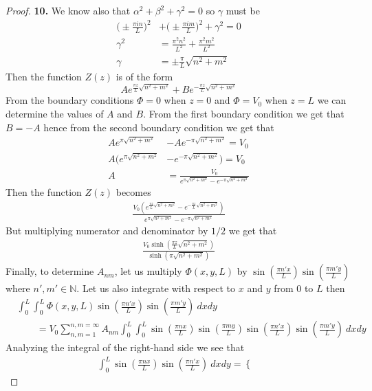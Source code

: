 \documentclass[11pt]{article}
\newcommand{\N}{\mathbb{N}}
\theoremstyle{definition}
\begin{document}
\begin{proof}{\textbf{10.}}
We know also that $\alpha^2 + \beta^2 + \gamma^2 = 0$ so $\gamma$ must be 
\begin{align*}
    \bigg(\pm\frac{\pi i n}{L}\bigg)^2 &+ \bigg(\pm\frac{\pi i m}{L}\bigg)^2
    + \gamma^2 = 0\\
    \gamma^2 &= \frac{\pi^2 n^2}{L^2} + \frac{\pi^2m^2}{L^2}\\
    \gamma &= \pm\frac{\pi}{L}\sqrt{n^2 + m^2}
\end{align*}
Then the function $Z(z)$ is of the form
$$Ae^{\frac{\pi z}{L}\sqrt{n^2 + m^2}} + Be^{-\frac{\pi z}{L}\sqrt{n^2 + m^2}}$$
From the boundary conditions $\Phi = 0$ when $z = 0$ and $\Phi = V_0$ when
$z = L$ we can determine the values of $A$ and $B$. From the first boundary
condition we get that $B = -A$ hence from the second boundary condition
we get that
\begin{align*}
    Ae^{\pi\sqrt{n^2 + m^2}} &- Ae^{-\pi\sqrt{n^2 + m^2}} = V_0\\
    A(e^{\pi\sqrt{n^2 + m^2}} &- e^{-\pi\sqrt{n^2 + m^2}}) = V_0\\
    A &= \frac{V_0}{e^{\pi\sqrt{n^2 + m^2}} - e^{-\pi\sqrt{n^2 + m^2}}}
\end{align*}
Then the function $Z(z)$ becomes 
\begin{align*}
    \frac{V_0(e^{\frac{\pi z}{L}\sqrt{n^2 + m^2}} - e^{-\frac{\pi z}{L}\sqrt{n^2 + m^2}})}
    {e^{\pi\sqrt{n^2 + m^2}} - e^{-\pi\sqrt{n^2 + m^2}}}
\end{align*}
But multiplying numerator and denominator by $1/2$ we get that
\begin{align*}
    \frac{V_0\sinh(\frac{\pi z}{L}\sqrt{n^2 + m^2})}{\sinh(\pi\sqrt{n^2 + m^2})}
\end{align*}
Finally, to determine $A_{nm}$, let us multiply $\Phi(x,y,L)$ by
$\sin(\frac{\pi n'x}{L}) \sin(\frac{\pi m'y}{L})$ where $n', m' \in \N$.
Let us also integrate with respect to $x$ and $y$ from $0$ to $L$ then
\begin{align*}
    &\int_0^L\int_0^L\Phi(x,y,L)\sin(\frac{\pi n' x}{L}) \sin(\frac{\pi m' y}{L})~dxdy\\
    &\qquad= V_0\sum_{n,m=1}^{n,m=\infty}
    A_{nm}\int_0^L\int_0^L \sin(\frac{\pi n x}{L})
    \sin(\frac{\pi m y}{L})\sin(\frac{\pi n' x}{L}) \sin(\frac{\pi m' y}{L})~dxdy
\end{align*}
Analyzing the integral of the right-hand side we see that
\begin{align*}
    \int_0^L \sin(\frac{\pi n x}{L})\sin(\frac{\pi n' x}{L})~dxdy
    = \begin{cases}

\end{cases}
\end{align*}
\end{proof}
\end{document}
